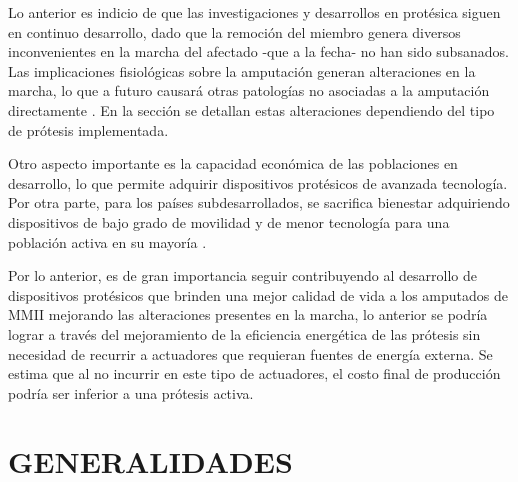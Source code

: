 \documentclass[12pt,english]{article}
\providecommand{\printnomenclature}{\printglossary}
\begin{document}
Lo anterior es indicio de que las investigaciones y desarrollos en
protésica siguen en continuo desarrollo, dado que la remoción del
miembro genera diversos inconvenientes en la marcha del afectado -que
a la fecha- no han sido subsanados. Las implicaciones fisiológicas
sobre la amputación generan alteraciones en la marcha, lo que a futuro
causará otras patologías no asociadas a la amputación directamente
\cite{Lemoyne}. En la sección 
se detallan estas alteraciones dependiendo del tipo de prótesis implementada.

Otro aspecto importante es la capacidad económica de las poblaciones
en desarrollo, lo que permite adquirir dispositivos protésicos de avanzada tecnología. Por otra parte, para los países subdesarrollados, se sacrifica bienestar adquiriendo dispositivos de bajo grado de movilidad y de menor tecnología para una población activa en su mayoría \cite{Lemoyne}.

Por lo anterior, es de gran importancia seguir contribuyendo al desarrollo
de dispositivos protésicos que brinden una mejor calidad de vida a los amputados de MMII mejorando las alteraciones presentes en la marcha, lo anterior se podría lograr a través del mejoramiento de la eficiencia energética de las prótesis sin necesidad de recurrir a actuadores que requieran fuentes de energía externa. Se estima que al no incurrir en este tipo de actuadores, el costo final de producción podría ser inferior a una prótesis activa.


\section{GENERALIDADES}

\printnomenclature{}
\end{document}
